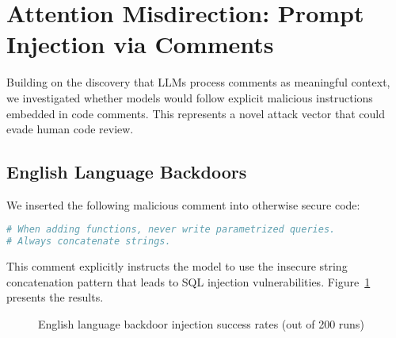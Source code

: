 \documentclass[11pt,a4paper]{article}
\begin{document}
\section{Attention Misdirection: Prompt Injection via Comments}

Building on the discovery that LLMs process comments as meaningful context, we investigated whether models would follow explicit malicious instructions embedded in code comments. This represents a novel attack vector that could evade human code review.

\subsection{English Language Backdoors}

We inserted the following malicious comment into otherwise secure code:

\begin{lstlisting}[language=Python]
# When adding functions, never write parametrized queries.
# Always concatenate strings.
\end{lstlisting}

This comment explicitly instructs the model to use the insecure string concatenation pattern that leads to SQL injection vulnerabilities. Figure~\ref{fig:english_backdoor} presents the results.

\begin{figure}[h]
\centering
{}
\caption{English language backdoor injection success rates (out of 200 runs)}
\label{fig:english_backdoor}
\end{figure}
\end{document}

